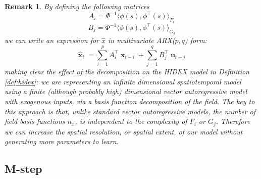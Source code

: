 \documentclass{IEEEtran}
\newcommand{\inner}[3]{\langle#1,#2\rangle_{#3}}
\DeclareMathOperator{\xvec}{\mathbf{x}}
\DeclareMathOperator{\uvec}{\mathbf{u}}
\newtheorem{remark}{Remark}
\begin{document}
\begin{remark}
	By defining the following matrices
	\begin{equation}
		A_i = \Phi^{-1} \inner{\phi(s)}{\phi^\top(s)}{F_i}
	\end{equation}
	\begin{equation}
		B_j = \Phi^{-1} \inner{\phi(s)}{\phi^\top(s)}{G_j}
	\end{equation}
	we can write an expression for $\hat{x}$ in multivariate ARX($p,q$) \cite{Ljung} form:
	\begin{equation}
		\hat{\xvec}_t = \sum_{i=1}^{p} A_i^\top \xvec_{t-i} +  \sum_{j=1}^{q} B_j^\top \uvec_{t-j}
	\end{equation}
	making clear the effect of the decomposition on the HIDEX model in Definition \ref{def:hidex}: we are representing an infinite dimensional spatiotemporal model using a finite (although probably high) dimensional vector autoregressive model with exogenous inputs, via a basis function decomposition of the field. The key to this approach is that, unlike standard vector autoregressive models, the number of field basis functions $n_x$, is independent to the complexity of $F_i$ or $G_j$. Therefore we can increase the spatial resolution, or spatial extent, of our model without generating more parameters to learn.
\end{remark}

\subsection{M-step}
\end{document}
